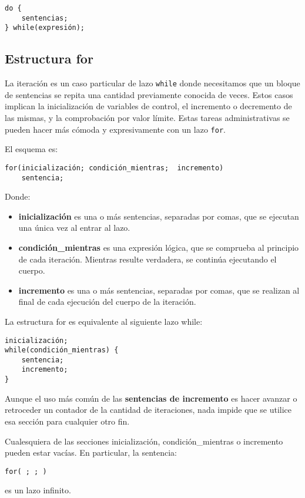 \begin{lstlisting}
do {
    sentencias;
} while(expresión);
\end{lstlisting}


\subsection{Estructura for}

La iteración es un caso particular de lazo \lstinline{while} donde necesitamos que un
bloque de sentencias se repita una cantidad previamente conocida de veces.
Estos casos implican la inicialización de variables de control, el incremento o
decremento de las mismas, y la comprobación por valor límite.
Estas tareas administrativas se pueden hacer más cómoda y expresivamente con un
lazo \lstinline{for}. 

El esquema es:
\begin{lstlisting}
for(inicialización; condición_mientras;  incremento)
    sentencia;
\end{lstlisting}

Donde:
\begin{itemize}
	\item \textbf{inicialización} es una o más sentencias, separadas por comas, que se
      ejecutan una única vez al entrar al lazo.
	\item \textbf{condición\_mientras} es una expresión lógica, que se comprueba al principio
      de cada iteración. Mientras resulte verdadera, se continúa ejecutando el
      cuerpo.
	\item \textbf{incremento} es una o más sentencias, separadas por comas, que se realizan
      al final de cada ejecución del cuerpo de la iteración. 
\end{itemize}
    
La estructura for es equivalente al siguiente lazo while:
\begin{lstlisting}
inicialización;
while(condición_mientras) {
    sentencia;
    incremento;
}
\end{lstlisting}

Aunque el uso más común de las \textbf{sentencias de incremento} es hacer avanzar o retroceder
un contador de la cantidad de iteraciones, nada impide que se utilice esa
sección para cualquier otro fin. 

Cualesquiera de las secciones inicialización, condición\_mientras o incremento
pueden estar vacías. En particular, la sentencia:
\begin{lstlisting}
for( ; ; )
\end{lstlisting}
es un lazo infinito.

